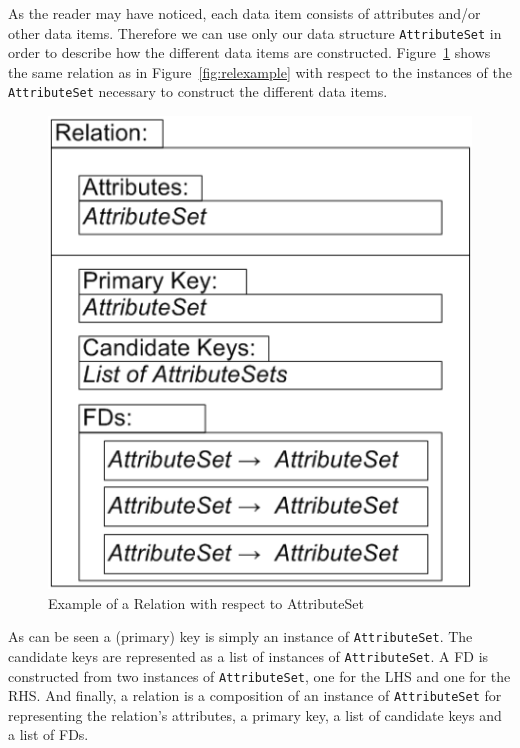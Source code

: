 As the reader may have noticed, each data item consists of attributes and/or other
data items. Therefore we can use only our data structure \verb=AttributeSet=
in order to describe how the different data items are constructed. 
Figure~\ref{fig:relexample2} shows the same relation as in Figure~\ref{fig:relexample} with
respect to the instances of the \verb=AttributeSet= necessary to construct the different
data items.

\begin{figure}[h]
  \begin{center}
    \includegraphics[scale=0.4]{./img/relation-example02a.png}
    \caption{Example of a Relation with respect to AttributeSet}
    \label{fig:relexample2}
  \end{center}
\end{figure}

As can be seen a (primary) key is simply an instance of \verb=AttributeSet=. The candidate keys
are represented as a list of instances of \verb=AttributeSet=. A FD is constructed from
two instances of \verb=AttributeSet=, one for the LHS and one for the RHS. And finally,
a relation is a composition of an instance of  \verb=AttributeSet= for representing
the relation's attributes, a primary key, a list of candidate keys and a list of FDs. 

